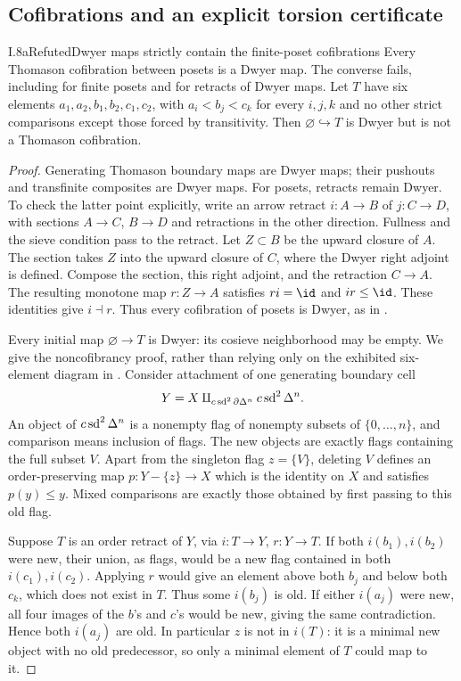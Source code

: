 \subsection{Cofibrations and an explicit torsion certificate}
\begin{claim}{I.8a}{Refuted}{Dwyer maps strictly contain the finite-poset cofibrations}
Every Thomason cofibration between posets is a Dwyer map. The converse
fails, including for finite posets and for retracts of Dwyer maps.
Let $T$ have six elements $a_1,a_2,b_1,b_2,c_1,c_2$, with
$a_i<b_j<c_k$ for every $i,j,k$ and no other strict comparisons except
those forced by transitivity. Then $\varnothing\hookrightarrow T$ is
Dwyer but is not a Thomason cofibration.
\end{claim}
\begin{proof}
Generating Thomason boundary maps are Dwyer maps; their pushouts and
transfinite composites are Dwyer maps. For posets, retracts remain
Dwyer. To check the latter point explicitly, write an arrow retract
$i:A\to B$ of $j:C\to D$, with sections $A\to C$, $B\to D$ and
retractions in the other direction. Fullness and the sieve condition
pass to the retract. Let $Z\subset B$ be the upward closure of $A$.
The section takes $Z$ into the upward closure of $C$, where the Dwyer
right adjoint is defined. Compose the section, this right adjoint,
and the retraction $C\to A$. The resulting monotone map $r:Z\to A$
satisfies $ri=\id$ and $ir\leq\id$. These identities give $i\dashv r$.
Thus every cofibration of posets is Dwyer, as in
\cite[Lemma~3.13]{I_MayStephanZakharevich2017}.

Every initial map $\varnothing\to T$ is Dwyer: its cosieve
neighborhood may be empty. We give the noncofibrancy proof, rather
than relying only on the exhibited six-element diagram in
\cite[Proposition~6.2]{I_MayStephanZakharevich2017}.
Consider attachment of one generating boundary cell
\[
 Y=X\amalg_{c\operatorname{sd}^2\partial\Delta^n}c\operatorname{sd}^2\Delta^n.
\]
An object of $c\operatorname{sd}^2\Delta^n$ is a nonempty flag of nonempty subsets
of $\{0,\ldots,n\}$, and comparison means inclusion of flags.
The new objects are exactly flags containing the full subset $V$.
Apart from the singleton flag $z=\{V\}$, deleting $V$ defines an
order-preserving map
$p:Y-\{z\}\to X$ which is the identity on $X$ and satisfies
$p(y)\leq y$. Mixed comparisons are exactly those obtained by first
passing to this old flag.

Suppose $T$ is an order retract of $Y$, via $i:T\to Y$, $r:Y\to T$.
If both $i(b_1),i(b_2)$ were new, their union, as flags, would be a
new flag contained in both $i(c_1),i(c_2)$. Applying $r$ would give
an element above both $b_j$ and below both $c_k$, which does not exist
in $T$. Thus some $i(b_j)$ is old. If either $i(a_j)$ were new, all
four images of the $b$'s and $c$'s would be new, giving the same
contradiction. Hence both $i(a_j)$ are old. In particular $z$ is not
in $i(T)$: it is a minimal new object with no old predecessor, so only
a minimal element of $T$ could map to it.


\end{proof}
